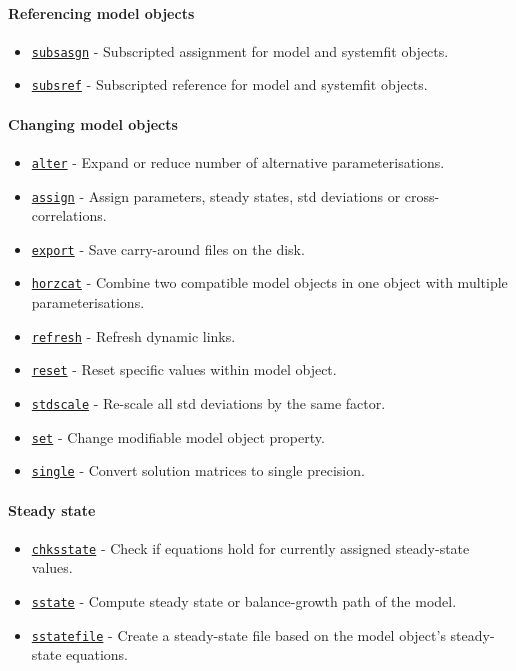  \paragraph{Referencing model objects}
 
 \begin{itemize}
 \item
   \href{model/subsasgn}{\texttt{subsasgn}} - Subscripted assignment for
   model and systemfit objects.
 \item
   \href{model/subsref}{\texttt{subsref}} - Subscripted reference for
   model and systemfit objects.
 \end{itemize}
 
 \paragraph{Changing model objects}
 
 \begin{itemize}
 \item
   \href{model/alter}{\texttt{alter}} - Expand or reduce number of
   alternative parameterisations.
 \item
   \href{model/assign}{\texttt{assign}} - Assign parameters, steady
   states, std deviations or cross-correlations.
 \item
   \href{model/export}{\texttt{export}} - Save carry-around files on the
   disk.
 \item
   \href{model/horzcat}{\texttt{horzcat}} - Combine two compatible model
   objects in one object with multiple parameterisations.
 \item
   \href{model/refresh}{\texttt{refresh}} - Refresh dynamic links.
 \item
   \href{model/reset}{\texttt{reset}} - Reset specific values within
   model object.
 \item
   \href{model/stdscale}{\texttt{stdscale}} - Re-scale all std deviations
   by the same factor.
 \item
   \href{model/set}{\texttt{set}} - Change modifiable model object
   property.
 \item
   \href{model/single}{\texttt{single}} - Convert solution matrices to
   single precision.
 \end{itemize}
 
 \paragraph{Steady state}
 
 \begin{itemize}
 \item
   \href{model/chksstate}{\texttt{chksstate}} - Check if equations hold
   for currently assigned steady-state values.
 \item
   \href{model/sstate}{\texttt{sstate}} - Compute steady state or
   balance-growth path of the model.
 \item
   \href{model/sstatefile}{\texttt{sstatefile}} - Create a steady-state
   file based on the model object's steady-state equations.
 \end{itemize}
 
